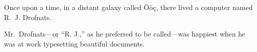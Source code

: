 

Once upon a time, in a distant galaxy called Ööç,
there lived a computer named R.~J. Drofnats.

Mr.~Drofnats—or “R. J.,” as he preferred to be called—was happiest when he was at work
typesetting beautiful documents.
